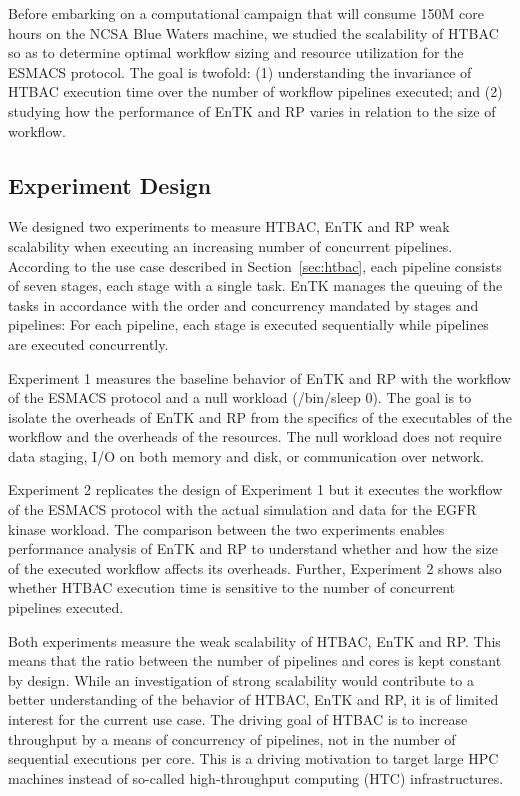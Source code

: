 
Before embarking on a computational campaign that will consume 150M core
hours on the NCSA Blue Waters machine, we studied the scalability of HTBAC so
as to determine optimal workflow sizing and resource utilization for the
ESMACS protocol. The goal is twofold: (1) understanding the invariance of
HTBAC execution time over the number of workflow pipelines executed; and (2)
studying how the performance of EnTK and RP varies in relation to the size of
workflow.

\subsection{Experiment Design}\label{ssec:exp_design}

We designed two experiments to measure HTBAC, EnTK and RP weak scalability
when executing an increasing number of concurrent pipelines. According to the
use case described in Section~\ref{sec:htbac}, each pipeline consists of
seven stages, each stage with a single task. EnTK manages the queuing of the
tasks in accordance with the order and concurrency mandated by stages and
pipelines: For each pipeline, each stage is executed sequentially while
pipelines are executed concurrently.

Experiment 1 measures the baseline behavior of EnTK and RP with the workflow
of the ESMACS protocol and a null workload (\textmd{/bin/sleep 0}). The goal
is to isolate the overheads of EnTK and RP from the specifics of the
executables of the workflow and the overheads of the resources. The null
workload does not require data staging, I/O on both memory and disk, or
communication over network.

Experiment 2 replicates the design of Experiment 1 but it executes the
workflow of the ESMACS protocol with the actual simulation and data for the
EGFR kinase workload. The comparison between the two experiments enables
performance analysis of EnTK and RP to understand whether and how the size of
the executed workflow affects its overheads. Further, Experiment 2 shows also
whether HTBAC execution time is sensitive to the number of concurrent
pipelines executed.

Both experiments measure the weak scalability of HTBAC, EnTK and RP\@. This
means that the ratio between the number of pipelines and cores is kept
constant by design. While an investigation of strong scalability would
contribute to a better understanding of the behavior of HTBAC, EnTK and RP,
it is of limited interest for the current use case. The driving goal of HTBAC
is to increase throughput by a means of concurrency of pipelines, not in the
number of sequential executions per core. This is a driving motivation to
target large HPC machines instead of so-called high-throughput computing (HTC) 
infrastructures.

